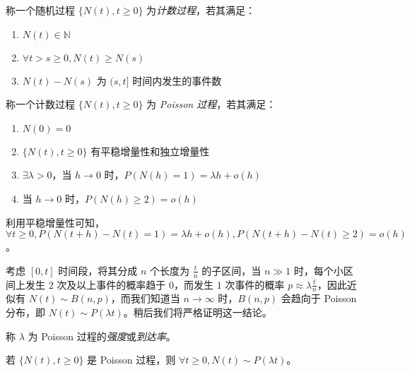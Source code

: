 \documentclass[../main.tex]{subfiles}
\begin{document}
\begin{definition}\label{def:6.3.1}
    称一个随机过程 $\{N(t),t\geq0\}$ 为\emph{计数过程}，若其满足：
    \begin{enumerate}
        \item $N(t)\in\mathbb N$
        \item $\forall t>s\geq0,N(t)\geq N(s)$
        \item $N(t)-N(s)$ 为 $(s,t]$ 时间内发生的事件数
    \end{enumerate}
\end{definition}

\begin{definition}\label{def:6.3.2}
    称一个计数过程 $\{N(t),t\geq0\}$ 为 \emph{Poisson 过程}，若其满足：
    \begin{enumerate}
        \item $N(0)=0$
        \item $\{N(t),t\geq0\}$ 有平稳增量性和独立增量性
        \item $\exists\lambda>0$，当 $h\rightarrow0$ 时，$P(N(h)=1)=\lambda h+o(h)$
        \item 当 $h\rightarrow0$ 时，$P(N(h)\geq2)=o(h)$
    \end{enumerate}
\end{definition}

利用平稳增量性可知，$\forall t\geq0,P(N(t+h)-N(t)=1)=\lambda h+o(h),P(N(t+h)-N(t)\geq2)=o(h)$。

考虑 $[0,t]$ 时间段，将其分成 $n$ 个长度为 $\frac tn$ 的子区间，当 $n\gg1$ 时，每个小区间上发生 $2$ 次及以上事件的概率趋于 $0$，而发生 $1$ 次事件的概率 $p\approx \lambda\frac tn$，因此近似有 $N(t)\sim B(n,p)$，而我们知道当 $n\rightarrow\infty$ 时，$B(n,p)$ 会趋向于 Poisson 分布，即 $N(t)\sim P(\lambda t)$。稍后我们将严格证明这一结论。

称 $\lambda$ 为 Poisson 过程的\emph{强度}或\emph{到达率}。

\begin{theorem}\label{thm:6.3.1}
    若 $\{N(t),t\geq0\}$ 是 Poisson 过程，则 $\forall t\geq0,N(t)\sim P(\lambda t)$。
\end{theorem}
\end{document}
